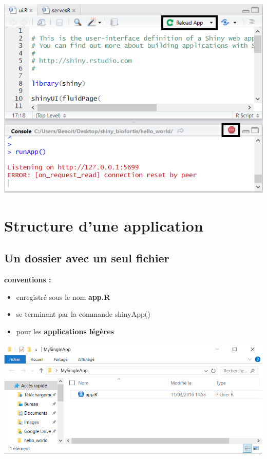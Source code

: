 \documentclass[
]{article}
\providecommand{\tightlist}{%
  \setlength{\itemsep}{0pt}\setlength{\parskip}{0pt}}
\begin{document}
\includegraphics{img/stop.png}

\hypertarget{structure-dune-application}{%
\section{Structure d'une application}\label{structure-dune-application}}

\hypertarget{un-dossier-avec-un-seul-fichier}{%
\subsection{Un dossier avec un seul
fichier}\label{un-dossier-avec-un-seul-fichier}}

\textbf{conventions :}

\begin{itemize}
\tightlist
\item
  enregistré sous le nom \textbf{app.R}
\item
  se terminant par la commande shinyApp()
\item
  pour les \textbf{applications légères}
\end{itemize}

\includegraphics{img/single_app.png}
\end{document}
